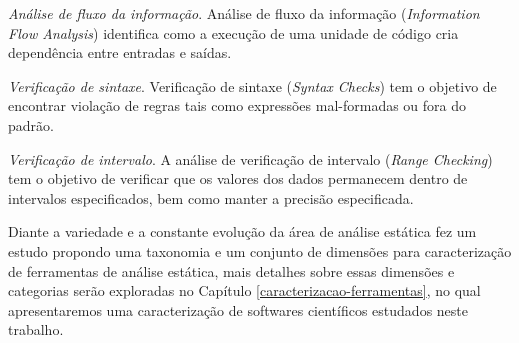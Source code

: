 \begin{description}
  \item \textit{Análise de fluxo da informação}.
    Análise de fluxo da informação ({\it Information Flow Analysis}) identifica
    como a execução de uma unidade de código cria dependência entre entradas e
    saídas.

  \item \textit{Verificação de sintaxe}.
    Verificação de sintaxe ({\it Syntax Checks}) tem o objetivo de encontrar
    violação de regras tais como expressões mal-formadas ou fora do padrão.

  \item \textit{Verificação de intervalo}.
    A análise de verificação de intervalo ({\it Range Checking}) tem o objetivo
    de verificar que os valores dos dados permanecem dentro de intervalos
    especificados, bem como manter a precisão especificada.

\end{description}

Diante a variedade e a constante evolução da área de análise estática
 fez um estudo propondo uma taxonomia e um conjunto de
dimensões para caracterização de ferramentas de análise estática, mais detalhes
sobre essas dimensões e categorias serão exploradas no Capítulo
\ref{caracterizacao-ferramentas}, no qual apresentaremos uma caracterização de
softwares científicos estudados neste trabalho.
